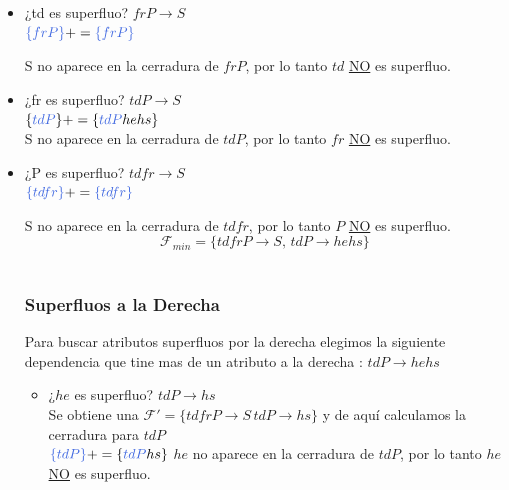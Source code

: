 \documentclass[10pt]{article}
\begin{document}
   \begin{itemize}
   	\item ¿td es superfluo? $frP \rightarrow S$\\
   	$\textcolor{RoyalBlue}{\{frP\}}+= \textcolor{RoyalBlue}{\{frP\}} $
   	
   	
   	S no aparece en la cerradura de $frP$, por lo tanto $td$ \underline{NO} es superfluo.\\
   	
   	\item ¿fr es superfluo? $tdP \rightarrow S$\\
   	$\{\textcolor{RoyalBlue}{tdP}\}+= \{\textcolor{RoyalBlue}{tdP}hehs\}$\\
   	
   	S no aparece en la cerradura de $tdP$, por lo tanto $fr$ \underline{NO} es superfluo.\\
   	
   	\item ¿P es superfluo? $tdfr \rightarrow S$\\
   	$\textcolor{RoyalBlue}{\{tdfr\}}+= \textcolor{RoyalBlue}{\{tdfr\}} $
   	
   	S no aparece en la cerradura de $tdfr$, por lo tanto $P$ \underline{NO} es superfluo.\\
   	
   	
   	$$\mathcal{F}_{min}=\{ tdfrP \rightarrow S,\, tdP \rightarrow hehs\}$$\\
   	
   	\subsubsection{Superfluos a la Derecha}
   	
   	Para buscar atributos superfluos por la derecha elegimos la siguiente dependencia que tine mas de un atributo a la derecha : $tdP \rightarrow hehs$
   	
   	
   	\begin{itemize}
   		\item ¿$he$ es superfluo? $tdP \rightarrow hs$\\
   		Se obtiene una $\mathcal{F'} = \{tdfrP \rightarrow S \,tdP \rightarrow hs\}$ y de aquí calculamos la cerradura para $tdP$\\
   		$\textcolor{RoyalBlue}{\{tdP\}}+= \{\textcolor{RoyalBlue}{tdP}hs\}$
   		$he$ no aparece en la cerradura de $tdP$, por lo tanto $he$ \underline{NO} es superfluo.\\
   		

\end{itemize}
\end{itemize}
\end{document}
